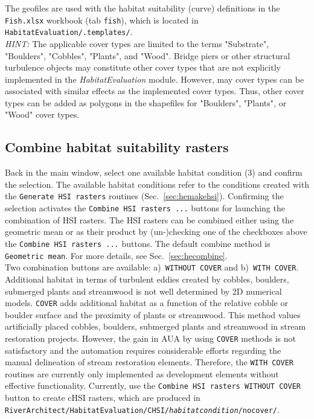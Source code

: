 The geofiles are used with the habitat suitability (curve) definitions in the \texttt{Fish.xlsx} workbook (tab \texttt{fish}), which is located in \texttt{HabitatEvaluation/.templates/}.\\

\textit{HINT:} The applicable cover types are limited to the terms "Substrate", "Boulders", "Cobbles", "Plants", and "Wood". Bridge piers or other structural turbulence objects may constitute other cover types that are not explicitly implemented in the \textit{HabitatEvaluation} module. However, may cover types can be associated with similar effects as the implemented cover types. Thus, other cover types can be added as polygons in the shapefiles for "Boulders", "Plants", or "Wood" cover types.

\subsection{Combine habitat suitability rasters}\label{sec:herunchsi}
Back in the main window, select one available habitat condition (3) and confirm the selection. The available habitat conditions refer to the conditions created with the \texttt{Generate HSI rasters} routines (Sec.~\ref{sec:hemakehsi}). Confirming the selection activates the \texttt{Combine HSI rasters ...} buttons for launching the combination of HSI rasters. The HSI rasters can be combined either using the geometric mean or as their product by (un-)checking one of the checkboxes above the \texttt{Combine HSI rasters ...} buttons. The default combine method is \texttt{Geometric mean}. For more details, see Sec.~\ref{sec:hecombine}.\\
Two combination buttons are available: a)~\texttt{WITHOUT COVER} and b)~\texttt{WITH COVER}. Additional habitat in terms of turbulent eddies created by cobbles, boulders, submerged plants and streamwood is not well determined by 2D numerical models. \texttt{COVER} adds additional habitat as a function of the relative cobble or boulder surface and the proximity of plants or streamwood. This method values artificially placed cobbles, boulders, submerged plants and streamwood in stream restoration projects. However, the gain in AUA by using \texttt{COVER} methods is not satisfactory and the automation requires considerable efforts regarding the manual delineation of stream restoration elements. Therefore, the \texttt{WITH COVER} routines are currently only implemented as development elements without effective functionality. Currently, use the \texttt{Combine HSI rasters WITHOUT COVER} button to create cHSI rasters, which are produced in \texttt{RiverArchitect/HabitatEvaluation/CHSI/\textit{habitat{\myUnderscore}condition}/no{\myUnderscore}cover/}.

